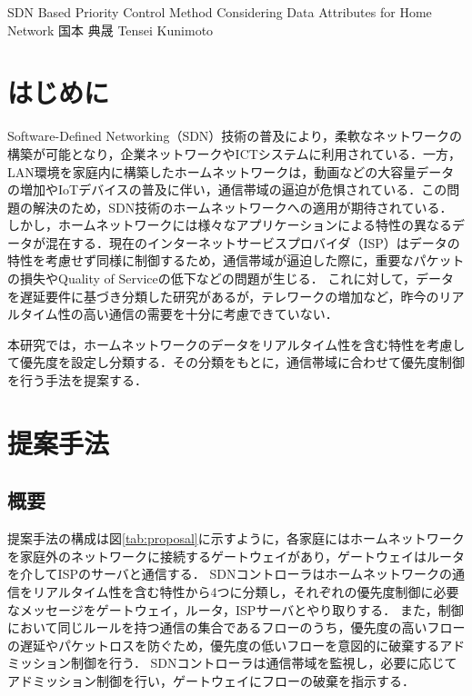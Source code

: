 \documentclass[a4paper,10pt,twocolumn,uplatex]{jsarticle}
\date{4}
\begin{document}
{SDN Based Priority Control Method Considering Data Attributes for Home Network}
{国本 典晟}
{Tensei Kunimoto}

\section{はじめに}
Software-Defined Networking（SDN）技術の普及により，柔軟なネットワークの構築が可能となり，企業ネットワークやICTシステムに利用されている．一方，LAN環境を家庭内に構築したホームネットワークは，動画などの大容量データの増加やIoTデバイスの普及に伴い，通信帯域の逼迫が危惧されている．この問題の解決のため，SDN技術のホームネットワークへの適用が期待されている\cite{cisco}．
しかし，ホームネットワークには様々なアプリケーションによる特性の異なるデータが混在する．現在のインターネットサービスプロバイダ（ISP）はデータの特性を考慮せず同様に制御するため，通信帯域が逼迫した際に，重要なパケットの損失やQuality of Serviceの低下などの問題が生じる．
これに対して，データを遅延要件に基づき分類した研究\cite{framework}があるが，テレワークの増加など，昨今のリアルタイム性の高い通信の需要を十分に考慮できていない．
\par
本研究では，ホームネットワークのデータをリアルタイム性を含む特性を考慮して優先度を設定し分類する．その分類をもとに，通信帯域に合わせて優先度制御を行う手法を提案する．\par

\section{提案手法}
\subsection{概要}
提案手法の構成は図\ref{tab:proposal}に示すように，各家庭にはホームネットワークを家庭外のネットワークに接続するゲートウェイがあり，ゲートウェイはルータを介してISPのサーバと通信する．
SDNコントローラはホームネットワークの通信をリアルタイム性を含む特性から4つに分類し，それぞれの優先度制御に必要なメッセージをゲートウェイ，ルータ，ISPサーバとやり取りする．
また，制御において同じルールを持つ通信の集合であるフローのうち，優先度の高いフローの遅延やパケットロスを防ぐため，優先度の低いフローを意図的に破棄するアドミッション制御を行う．
SDNコントローラは通信帯域を監視し，必要に応じてアドミッション制御を行い，ゲートウェイにフローの破棄を指示する．\par
\end{document}

